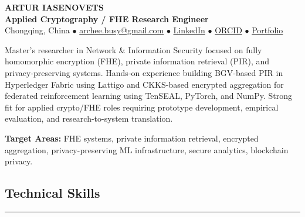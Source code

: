 \documentclass[10.5pt,letterpaper]{article}
\newcommand{\sectionline}[1]{
\vspace{0.18cm}
\subsection*{\large #1}
\vspace{-0.55em}
\hrule
\vspace{0.25em}
}
\begin{document}
\begin{center}
    {\LARGE \textbf{ARTUR IASENOVETS}} \\
    \vspace{0.06cm}
    \textbf{Applied Cryptography / FHE Research Engineer} \\
    \vspace{0.08cm}
    Chongqing, China $\bullet$
    \href{mailto:archee.busy@gmail.com}{archee.busy@gmail.com} $\bullet$
    \href{https://linkedin.com/in/iasenovets}{LinkedIn} $\bullet$
    \href{https://orcid.org/0009-0008-0008-3746}{ORCID} $\bullet$
    \href{https://iasenovets.github.io/}{Portfolio}
\end{center}

\vspace{0.12cm}

\noindent
Master's researcher in Network \& Information Security focused on fully homomorphic encryption
(FHE), private information retrieval (PIR), and privacy-preserving systems. Hands-on experience
building BGV-based PIR in Hyperledger Fabric using Lattigo and CKKS-based encrypted aggregation
for federated reinforcement learning using TenSEAL, PyTorch, and NumPy. Strong fit for applied
crypto/FHE roles requiring prototype development, empirical evaluation, and research-to-system
translation.

\vspace{0.1cm}

\noindent\textbf{Target Areas:} FHE systems, private information retrieval, encrypted aggregation,
privacy-preserving ML infrastructure, secure analytics, blockchain privacy.

\sectionline{Technical Skills}
\end{document}
